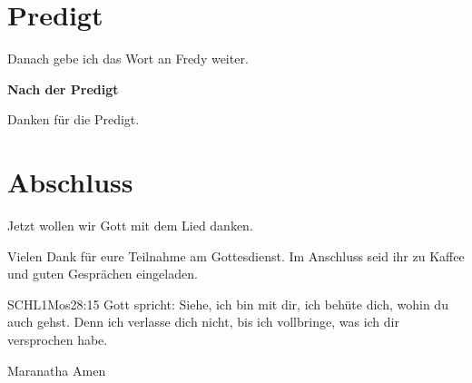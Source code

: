 \section{Predigt}

Danach gebe ich das Wort an Fredy weiter.

\textbf{Nach der Predigt}

Danken für die Predigt.

\section{Abschluss}

Jetzt wollen wir Gott mit dem Lied  danken.


Vielen Dank für eure Teilnahme am Gottesdienst. Im Anschluss seid ihr zu Kaffee und guten Gesprächen eingeladen.
\beten{}

\begin{bibelbox}{SCHL}{1Mos}{28:15}
Gott spricht: Siehe, ich bin mit dir,
ich behüte dich, wohin du auch gehst.
Denn ich verlasse dich nicht,
bis ich vollbringe, was ich dir versprochen habe.
\end{bibelbox}

Maranatha Amen
